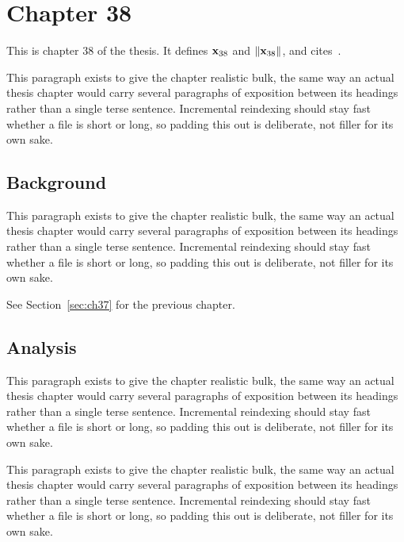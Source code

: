 \section{Chapter 38}
\label{sec:ch38}

This is chapter 38 of the thesis. It defines $\mathbf{x}_{38}$ and $\lVert \mathbf{x}_{38} \rVert$, and cites~\cite{ref1}.

This paragraph exists to give the chapter realistic bulk, the same way an actual thesis chapter would carry several paragraphs of exposition between its headings rather than a single terse sentence. Incremental reindexing should stay fast whether a file is short or long, so padding this out is deliberate, not filler for its own sake.

\subsection{Background}
\label{sec:ch38:background}

This paragraph exists to give the chapter realistic bulk, the same way an actual thesis chapter would carry several paragraphs of exposition between its headings rather than a single terse sentence. Incremental reindexing should stay fast whether a file is short or long, so padding this out is deliberate, not filler for its own sake.

See Section~\ref{sec:ch37} for the previous chapter.

\subsection{Analysis}
\label{sec:ch38:analysis}

This paragraph exists to give the chapter realistic bulk, the same way an actual thesis chapter would carry several paragraphs of exposition between its headings rather than a single terse sentence. Incremental reindexing should stay fast whether a file is short or long, so padding this out is deliberate, not filler for its own sake.

This paragraph exists to give the chapter realistic bulk, the same way an actual thesis chapter would carry several paragraphs of exposition between its headings rather than a single terse sentence. Incremental reindexing should stay fast whether a file is short or long, so padding this out is deliberate, not filler for its own sake.
